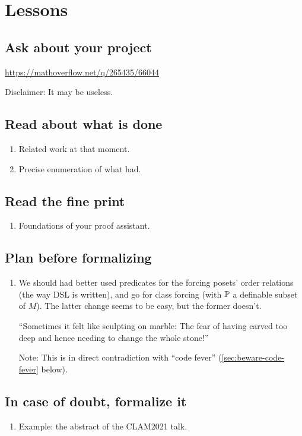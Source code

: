 \section{Lessons}\label{sec:lessons}

\subsection{Ask about your project}
\url{https://mathoverflow.net/q/265435/66044}

Disclaimer: It may be useless.

\subsection{Read about what is done}
\begin{enumerate}
\item Related work at that moment.
\item Precise enumeration of what  had.
\end{enumerate}

\subsection{Read the fine print}
\begin{enumerate}
\item Foundations of your proof assistant.
\end{enumerate}

\subsection{Plan before formalizing}
\begin{enumerate}
\item We should had better used predicates for the forcing posets'
  order relations (the way DSL is written), and go for class forcing
  (with $\mathbb{P}$ a definable subset of $M$). The latter change seems to be
  easy, but the former doesn't.
  
  “Sometimes it felt like sculpting on marble: The fear of having
  carved too deep and hence needing to change the whole stone!”

  Note: This is in direct contradiction with “code fever”
  (\ref{sec:beware-code-fever} below).
\end{enumerate}

\subsection{In case of doubt, formalize it}
\begin{enumerate}
\item Example: the abstract of the CLAM2021 talk.
\end{enumerate}

